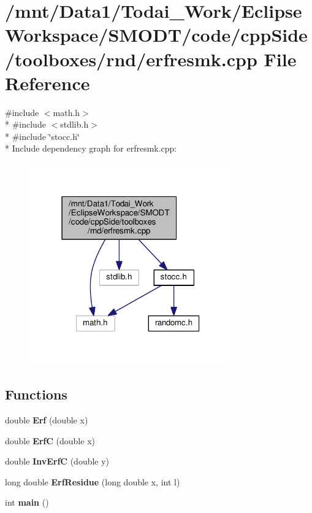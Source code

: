 \section{/mnt/\-Data1/\-Todai\-\_\-\-Work/\-Eclipse\-Workspace/\-S\-M\-O\-D\-T/code/cpp\-Side/toolboxes/rnd/erfresmk.cpp File Reference}
\label{toolboxes_2rnd_2erfresmk_8cpp}
{\ttfamily \#include $<$math.\-h$>$}\\*
{\ttfamily \#include $<$stdlib.\-h$>$}\\*
{\ttfamily \#include \char`\"{}stocc.\-h\char`\"{}}\\*
Include dependency graph for erfresmk.\-cpp\-:
\nopagebreak
\begin{figure}[H]
\begin{center}
\leavevmode
\includegraphics[width=247pt]{toolboxes_2rnd_2erfresmk_8cpp__incl}
\end{center}
\end{figure}
\subsection*{Functions}
\begin{DoxyCompactItemize}
\item 
double {\bf Erf} (double x)
\item 
double {\bf Erf\-C} (double x)
\item 
double {\bf Inv\-Erf\-C} (double y)
\item 
long double {\bf Erf\-Residue} (long double x, int l)
\item 
int {\bf main} ()
\end{DoxyCompactItemize}
